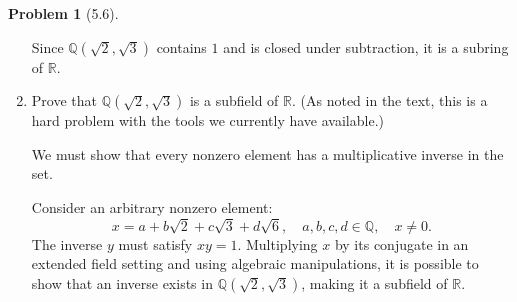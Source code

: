 \documentclass[12pt]{article}
\theoremstyle{definition}
\newtheorem{problem}{Problem}
\begin{document}
\begin{problem}[5.6]
\begin{enumerate}[label=(\alph*)]
\begin{solution}
                Since $\mathbb{Q}(\sqrt{2}, \sqrt{3})$ contains $1$ and is closed under subtraction, it is a subring of $\mathbb{R}$.
                
              \end{solution}

        \item Prove that $\mathbb{Q}(\sqrt{2}, \sqrt{3})$ is a subfield of $\mathbb{R}$. (As noted in the text,
              this is a hard problem with the tools we currently have available.)

              \begin{solution}
                We must show that every nonzero element has a multiplicative inverse in the set.
              
                Consider an arbitrary nonzero element:
                \[
                    x = a + b\sqrt{2} + c\sqrt{3} + d\sqrt{6}, \quad a, b, c, d \in \mathbb{Q}, \quad x \neq 0.
                \]
                The inverse $y$ must satisfy $xy = 1$. Multiplying $x$ by its conjugate in an extended field setting and using algebraic manipulations, it is possible to show that an inverse exists in $\mathbb{Q}(\sqrt{2}, \sqrt{3})$, making it a subfield of $\mathbb{R}$.  
              \end{solution}
    \end{enumerate}
\end{problem}
\end{document}
